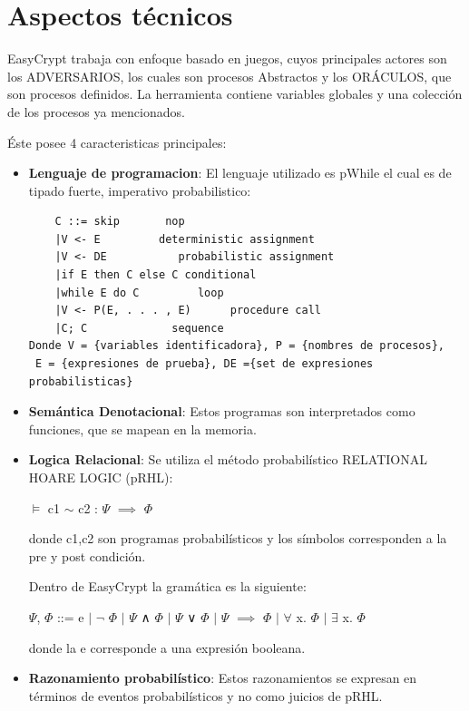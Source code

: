 \documentclass[runningheads,a4paper]{llncs}
\begin{document}
\section{Aspectos técnicos}
EasyCrypt trabaja con enfoque basado en juegos, cuyos principales actores son los ADVERSARIOS, los cuales son procesos Abstractos y los ORÁCULOS, que son procesos definidos. La herramienta contiene variables globales y una colección de los procesos ya mencionados.

Éste posee 4 caracteristicas principales:
\begin{itemize}
	\item \textbf{Lenguaje de programacion}:
El lenguaje utilizado es pWhile el cual es de tipado fuerte, imperativo probabilistico:

\begin{Verbatim}
	C ::= skip		 nop
	|V <- E		    deterministic assignment
	|V <- DE		   probabilistic assignment
	|if E then C else C	conditional
	|while E do C	      loop
	|V <- P(E, . . . , E)      procedure call
	|C; C		      sequence
Donde V = {variables identificadora}, P = {nombres de procesos},
 E = {expresiones de prueba}, DE ={set de expresiones probabilisticas}
\end{Verbatim}

	\item \textbf{Semántica Denotacional}:
Estos programas son interpretados como funciones, que se mapean en la memoria.

	\item \textbf{Logica Relacional}: Se utiliza el método probabilístico RELATIONAL HOARE LOGIC (pRHL):
		
\centerline{$\models$ c1 $\sim$ c2 : $\Psi$ $\implies$ $\Phi$}	
			
donde c1,c2 son programas probabilísticos y los símbolos corresponden a la pre y post condición.

Dentro de EasyCrypt la gramática es la siguiente:

\centerline{$\Psi$, $\Phi$ ::= e $\mid$ $\neg$ $\Phi$ $\mid$ $\Psi$ ∧ $\Phi$ $\mid$ $\Psi$ ∨ $\Phi$ $\mid$ $\Psi$ $\implies$ $\Phi$ $\mid$ $\forall$ x. $\Phi$ $\mid$ $\exists$ x. $\Phi$}

donde la e corresponde a una expresión booleana.


	\item \textbf{Razonamiento probabilístico}:
Estos razonamientos se expresan en términos de eventos probabilísticos y no como juicios de pRHL.\cite{article3}

\end{itemize}
\end{document}
